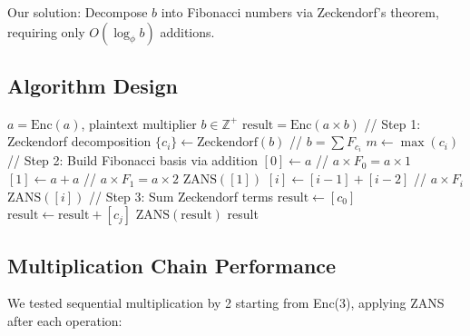 \documentclass[11pt]{article}
\begin{document}
Our solution: Decompose $b$ into Fibonacci numbers via Zeckendorf's theorem, requiring only $O(\log_\phi b)$ additions.

\subsection{Algorithm Design}

\begin{algorithm}[H]
\caption{Fibonacci-Decomposed Multiplication}
\begin{algorithmic}[1]
\Require $a = \text{Enc}(a)$, plaintext multiplier $b \in \mathbb{Z}^+$
\Ensure $\text{result} = \text{Enc}(a \times b)$
\State // Step 1: Zeckendorf decomposition
\State $\{c_i\} \leftarrow \text{Zeckendorf}(b)$ // $b = \sum F_{c_i}$
\State $m \leftarrow \max(c_i)$
\State // Step 2: Build Fibonacci basis via addition
\State $[0] \leftarrow a$ // $a \times F_0 = a \times 1$
\State $[1] \leftarrow a + a$ // $a \times F_1 = a \times 2$
\State $\text{ZANS}([1])$
    \State $[i] \leftarrow [i-1] + [i-2]$ // $a \times F_i$
    \State $\text{ZANS}([i])$
\EndFor
\State // Step 3: Sum Zeckendorf terms
\State $\text{result} \leftarrow [c_0]$
    \State $\text{result} \leftarrow \text{result} + [c_j]$
    \State $\text{ZANS}(\text{result})$
\EndFor
\State \Return result
\end{algorithmic}
\end{algorithm}

\subsection{Multiplication Chain Performance}

We tested sequential multiplication by 2 starting from Enc(3), applying ZANS after each operation:
\end{document}
